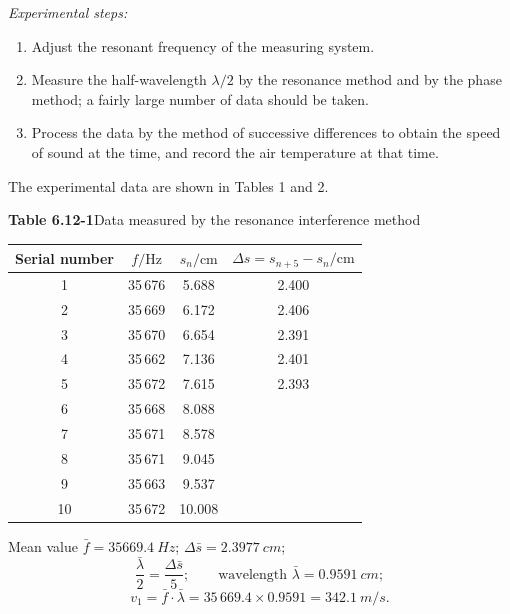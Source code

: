 \noindent\textit{Experimental steps:}
\begin{enumerate}[label=(\arabic*),leftmargin=2.2em,itemsep=1pt,topsep=2pt]
\item Adjust the resonant frequency of the measuring system.
\item Measure the half-wavelength $\lambda/2$ by the resonance method and by the phase method; a fairly large number of data should be taken.
\item Process the data by the method of successive differences to obtain the speed of sound at the time, and record the air temperature at that time.
\end{enumerate}
The experimental data are shown in Tables 1 and 2.

\begin{center}
\textbf{Table 6.12-1}\quad Data measured by the resonance interference method\\[3pt]
\begin{tabular}{cccc}
\toprule
Serial number & $f/\mathrm{Hz}$ & $s_n/\mathrm{cm}$ & $\Delta s=s_{n+5}-s_n/\mathrm{cm}$\\
\midrule
1  & 35\,676 & 5.688  & 2.400\\
2  & 35\,669 & 6.172  & 2.406\\
3  & 35\,670 & 6.654  & 2.391\\
4  & 35\,662 & 7.136  & 2.401\\
5  & 35\,672 & 7.615  & 2.393\\
6  & 35\,668 & 8.088  & \\
7  & 35\,671 & 8.578  & \\
8  & 35\,671 & 9.045  & \\
9  & 35\,663 & 9.537  & \\
10 & 35\,672 & 10.008 & \\
\bottomrule
\end{tabular}
\end{center}

\noindent Mean value $\bar f=\SI{35669.4}{Hz}$; $\Delta\bar s=\SI{2.3977}{cm}$;
\begin{equation*}
\frac{\bar\lambda}{2}=\frac{\Delta\bar s}{5};\qquad \text{wavelength } \bar\lambda=\SI{0.9591}{cm};
\end{equation*}
\begin{equation*}
v_1=\bar f\cdot\bar\lambda=35\,669.4\times0.9591=\SI{342.1}{m/s}.
\end{equation*}

